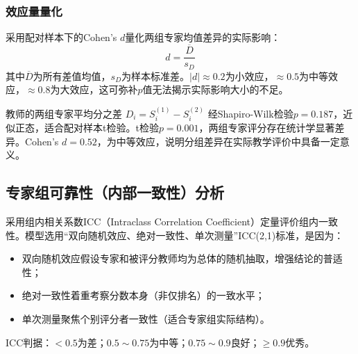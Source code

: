 \subsubsection{效应量量化}
采用配对样本下的Cohen's $d$量化两组专家均值差异的实际影响：
\[
d = \frac{\overline{D}}{s_D}
\]
其中$\overline{D}$为所有差值均值，$s_D$为样本标准差。$|d| \approx 0.2$为小效应，$\approx 0.5$为中等效应，$\approx 0.8$为大效应，这可弥补$p$值无法揭示实际影响大小的不足。

教师的两组专家平均分之差 $D_i = S^{(1)}_i - S^{(2)}_i$ 经Shapiro-Wilk检验$p=0.187$，近似正态，适合配对样本t检验。t检验$p=0.001$，两组专家评分存在统计学显著差异。Cohen's $d=0.52$，为中等效应，说明分组差异在实际教学评价中具备一定意义。

\subsection{专家组可靠性（内部一致性）分析}
采用组内相关系数ICC（Intraclass Correlation Coefficient）定量评价组内一致性。模型选用“双向随机效应、绝对一致性、单次测量”ICC(2,1)标准，是因为：

\begin{itemize}
    \item 双向随机效应假设专家和被评分教师均为总体的随机抽取，增强结论的普适性；
    \item 绝对一致性着重考察分数本身（非仅排名）的一致水平；
    \item 单次测量聚焦个别评分者一致性（适合专家组实际结构）。
\end{itemize}

ICC判据：$<0.5$为差；$0.5{\sim}0.75$为中等；$0.75{\sim}0.9$良好；$\geq0.9$优秀。

